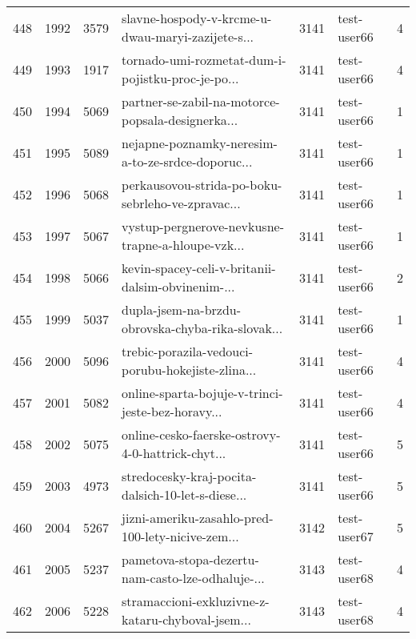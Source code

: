 \begin{tabular}{lrrlrlr}
448  &       1992 &     3579 &  slavne-hospody-v-krcme-u-dwau-maryi-zazijete-s... &     3141 &                  test-user66 &               4 \\
449  &       1993 &     1917 &  tornado-umi-rozmetat-dum-i-pojistku-proc-je-po... &     3141 &                  test-user66 &               4 \\
450  &       1994 &     5069 &  partner-se-zabil-na-motorce-popsala-designerka... &     3141 &                  test-user66 &               1 \\
451  &       1995 &     5089 &  nejapne-poznamky-neresim-a-to-ze-srdce-doporuc... &     3141 &                  test-user66 &               1 \\
452  &       1996 &     5068 &  perkausovou-strida-po-boku-sebrleho-ve-zpravac... &     3141 &                  test-user66 &               1 \\
453  &       1997 &     5067 &  vystup-pergnerove-nevkusne-trapne-a-hloupe-vzk... &     3141 &                  test-user66 &               1 \\
454  &       1998 &     5066 &  kevin-spacey-celi-v-britanii-dalsim-obvinenim-... &     3141 &                  test-user66 &               2 \\
455  &       1999 &     5037 &  dupla-jsem-na-brzdu-obrovska-chyba-rika-slovak... &     3141 &                  test-user66 &               1 \\
456  &       2000 &     5096 &  trebic-porazila-vedouci-porubu-hokejiste-zlina... &     3141 &                  test-user66 &               4 \\
457  &       2001 &     5082 &  online-sparta-bojuje-v-trinci-jeste-bez-horavy... &     3141 &                  test-user66 &               4 \\
458  &       2002 &     5075 &  online-cesko-faerske-ostrovy-4-0-hattrick-chyt... &     3141 &                  test-user66 &               5 \\
459  &       2003 &     4973 &  stredocesky-kraj-pocita-dalsich-10-let-s-diese... &     3141 &                  test-user66 &               5 \\
460  &       2004 &     5267 &  jizni-ameriku-zasahlo-pred-100-lety-nicive-zem... &     3142 &                  test-user67 &               5 \\
461  &       2005 &     5237 &  pametova-stopa-dezertu-nam-casto-lze-odhaluje-... &     3143 &                  test-user68 &               4 \\
462  &       2006 &     5228 &  stramaccioni-exkluzivne-z-kataru-chyboval-jsem... &     3143 &                  test-user68 &               4 \\

\end{tabular}
